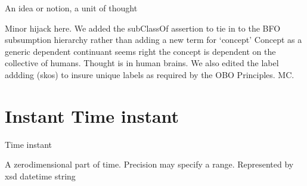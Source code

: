 \documentclass[letterpaper,10pt,english]{sphinxmanual}
\begin{document}
\begin{sphinxShadowBox}

\sphinxAtStartPar
An idea or notion, a unit of thought
\end{sphinxShadowBox}

\begin{sphinxShadowBox}

\sphinxAtStartPar
Minor hijack here.  We added the subClassOf assertion to tie in to the BFO subsumption hierarchy rather than adding a new term for ‘concept’
Concept as a generic dependent continuant seems right \textendash{} the concept is dependent on the collective of humans.  Thought is in human brains.
We also edited the label addding (skos) to insure unique labels as required by the OBO Principles. MC.
\end{sphinxShadowBox}
\begin{quote}
\label{\detokenize{doc-Instant:instant}}\label{\detokenize{doc-Instant:time-instant}}\label{\detokenize{doc-Instant:instant}}
\ignorespaces \end{quote}


\section{Instant \sphinxhyphen{} Time instant}
\label{\detokenize{doc-Instant:instant-time-instant}}\label{\detokenize{doc-Instant:index-0}}\label{\detokenize{doc-Instant::doc}}
\begin{sphinxShadowBox}

\sphinxAtStartPar
Time instant
\end{sphinxShadowBox}

\begin{sphinxShadowBox}

\sphinxAtStartPar
A zero\sphinxhyphen{}dimensional part of time.  Precision may specify a range.  Represented by xsd datetime string
\end{sphinxShadowBox}

\begin{sphinxShadowBox}

\sphinxAtStartPar
{}
\end{sphinxShadowBox}
\begin{quote}
\label{\detokenize{doc-TemporalUnit:temporalunit}}\label{\detokenize{doc-TemporalUnit:temporal-unit}}\label{\detokenize{doc-TemporalUnit:temporalunit}}
\ignorespaces \end{quote}
\end{document}
